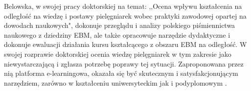 \documentclass[a4paper,12pt,twoside,openany]{report}
\begin{document}
Belowska, w swojej pracy doktorskiej na temat: ,,Ocena wpływu kształcenia na odległość na wiedzę i postawy pielęgniarek wobec praktyki zawodowej opartej na dowodach naukowych", dokonuje przeglądu i analizy polskiego piśmiennictwa naukowego z dziedziny EBM, ale także opracowuje narzędzie dydaktyczne i dokonuje ewaluacji działania kursu kształcącego z obszaru EBM na odległość. W swojej rozprawie doktorskiej ocenia wiedzę pielęgniarek w tym zakresie jako niewystarczającą i zgłasza potrzebę poprawy tej sytuacji. Zaproponowana przez nią platforma e-learningowa, okazała się być skutecznym i satysfakcjonującym narzędziem, zarówno w kształceniu uniwersyteckim jak i podyplomowym \cite{belowska}.




\appendix
\end{document}
